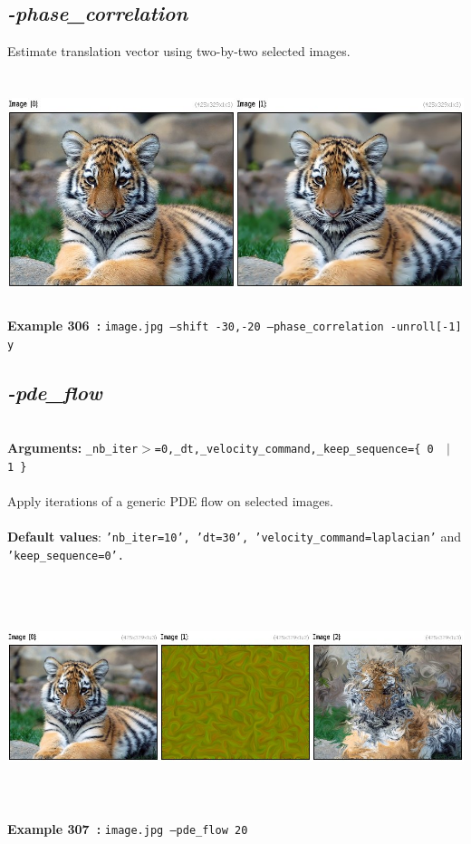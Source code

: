 \documentclass[a4paper,11pt,twoside]{book}
\begin{document}
\subsection{\emph{-phase\_correlation} }\vspace*{-0.5em}
Estimate translation vector using two-by-two selected images.
\begin{center}\includegraphics[keepaspectratio=true,height=7cm,width=\textwidth]{img/gmic_def306.jpg}\\
{\footnotesize \textbf{Example 306~:} \texttt{image.jpg --shift -30,-20 --phase\_correlation -unroll[-1] y}}
\end{center}

\subsection{\emph{-pde\_flow} }\vspace*{-0.5em}
~\\\textbf{Arguments: } 
{\small \texttt{\_nb\_iter$>$=0,\_dt,\_velocity\_command,\_keep\_sequence=\{ 0 ~$|$~ 1 \}}}\\~\\
Apply iterations of a generic PDE flow on selected images.
~\\~\\\textbf{Default values}: {\small \texttt{'nb\_iter=10', 'dt=30', 'velocity\_command=laplacian'} and \texttt{'keep\_sequence=0'.}}
\begin{center}\includegraphics[keepaspectratio=true,height=7cm,width=\textwidth]{img/gmic_def307.jpg}\\
{\footnotesize \textbf{Example 307~:} \texttt{image.jpg --pde\_flow 20}}
\end{center}
\end{document}
